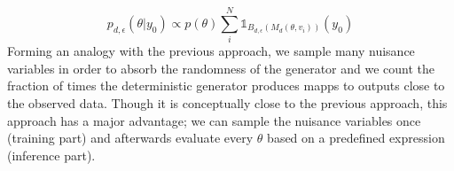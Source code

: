 \begin{equation} \label{eq:posterior} p_{d,\epsilon}(\theta|y_0)
  \propto p(\theta) \sum_i^N \mathbb{1}_{B_{d,\epsilon}(M_d(\theta,
    v_i))} (y_0)
\end{equation}
%
Forming an analogy with the previous approach, we sample many nuisance
variables in order to absorb the randomness of the generator and we
count the fraction of times the deterministic generator produces mapps
to outputs close to the observed data. Though it is conceptually close
to the previous approach, this approach has a major advantage; we can
sample the nuisance variables once (training part) and afterwards
evaluate every $\theta$ based on a predefined expression (inference
part).
